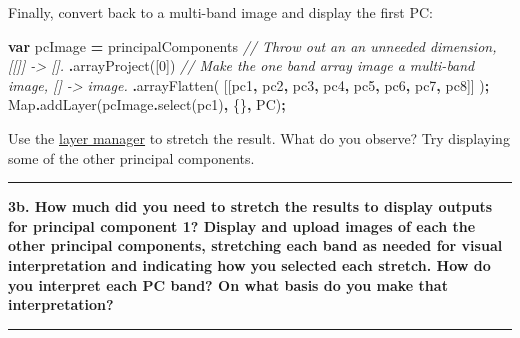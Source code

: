 \documentclass[
]{article}
\newenvironment{Shaded}{\begin{snugshade}}{\end{snugshade}}
\newcommand{\BuiltInTok}[1]{#1}
\newcommand{\CommentTok}[1]{\textcolor[rgb]{0.56,0.35,0.01}{\textit{#1}}}
\newcommand{\DecValTok}[1]{\textcolor[rgb]{0.00,0.00,0.81}{#1}}
\newcommand{\FunctionTok}[1]{\textcolor[rgb]{0.00,0.00,0.00}{#1}}
\newcommand{\KeywordTok}[1]{\textcolor[rgb]{0.13,0.29,0.53}{\textbf{#1}}}
\newcommand{\NormalTok}[1]{#1}
\newcommand{\OperatorTok}[1]{\textcolor[rgb]{0.81,0.36,0.00}{\textbf{#1}}}
\newcommand{\StringTok}[1]{\textcolor[rgb]{0.31,0.60,0.02}{#1}}
\begin{document}
Finally, convert back to a multi-band image and display the first PC:

\begin{Shaded}
\begin{Highlighting}[]
\KeywordTok{var}\NormalTok{ pcImage }\OperatorTok{=}\NormalTok{ principalComponents    }
\CommentTok{// Throw out an an  unneeded dimension, [[]] {-}\textgreater{} [].    }
                \OperatorTok{.}\FunctionTok{arrayProject}\NormalTok{([}\DecValTok{0}\NormalTok{])    }
\CommentTok{// Make the one band  array image a multi{-}band image, [] {-}\textgreater{} image.    }
                \OperatorTok{.}\FunctionTok{arrayFlatten}\NormalTok{(}
\NormalTok{          [[}\StringTok{\textquotesingle{}pc1\textquotesingle{}}\OperatorTok{,} \StringTok{\textquotesingle{}pc2\textquotesingle{}}\OperatorTok{,} \StringTok{\textquotesingle{}pc3\textquotesingle{}}\OperatorTok{,} \StringTok{\textquotesingle{}pc4\textquotesingle{}}\OperatorTok{,} \StringTok{\textquotesingle{}pc5\textquotesingle{}}\OperatorTok{,} \StringTok{\textquotesingle{}pc6\textquotesingle{}}\OperatorTok{,} \StringTok{\textquotesingle{}pc7\textquotesingle{}}\OperatorTok{,} \StringTok{\textquotesingle{}pc8\textquotesingle{}}\NormalTok{]]}
\NormalTok{        )}\OperatorTok{;}      
\BuiltInTok{Map}\OperatorTok{.}\FunctionTok{addLayer}\NormalTok{(pcImage}\OperatorTok{.}\FunctionTok{select}\NormalTok{(}\StringTok{\textquotesingle{}pc1\textquotesingle{}}\NormalTok{)}\OperatorTok{,}\NormalTok{ \{\}}\OperatorTok{,} \StringTok{\textquotesingle{}PC\textquotesingle{}}\NormalTok{)}\OperatorTok{;}   
\end{Highlighting}
\end{Shaded}

Use the \href{https://developers.google.com/earth-engine/playground\#layer-manager}{layer manager} to stretch the result. What do you observe? Try displaying some of the other principal components.

\begin{center}\rule{0.5\linewidth}{0.5pt}\end{center}

\textbf{3b. How much did you need to stretch the results to display outputs for principal component 1? Display and upload images of each the other principal components, stretching each band as needed for visual interpretation and indicating how you selected each stretch. How do you interpret each PC band? On what basis do you make that interpretation? }

\begin{center}\rule{0.5\linewidth}{0.5pt}\end{center}
\end{document}
